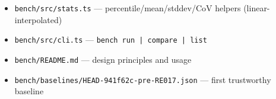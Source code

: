 \begin{itemize}
  \begin{itemize}
  \tightlist
  \item
    \texttt{c\allowbreak{}h\allowbreak{}i\allowbreak{}l\allowbreak{}d\allowbreak{}.\allowbreak{}t\allowbreak{}s} runs ONE sample of ONE scenario in a fresh V8 isolate and exits
  \item
    \texttt{r\allowbreak{}u\allowbreak{}n\allowbreak{}n\allowbreak{}e\allowbreak{}r\allowbreak{}.\allowbreak{}t\allowbreak{}s} spawns N children per scenario, aggregates stats
  \item
    \texttt{c\allowbreak{}o\allowbreak{}m\allowbreak{}p\allowbreak{}a\allowbreak{}r\allowbreak{}e\allowbreak{}.\allowbreak{}t\allowbreak{}s} diffs two report JSONs with a regression gate
  \end{itemize}
\item
  \texttt{b\allowbreak{}e\allowbreak{}n\allowbreak{}c\allowbreak{}h\allowbreak{}/\allowbreak{}s\allowbreak{}r\allowbreak{}c\allowbreak{}/\allowbreak{}s\allowbreak{}t\allowbreak{}a\allowbreak{}t\allowbreak{}s\allowbreak{}.\allowbreak{}t\allowbreak{}s} --- percentile/mean/stddev/CoV helpers (linear-interpolated)
\item
  \texttt{b\allowbreak{}e\allowbreak{}n\allowbreak{}c\allowbreak{}h\allowbreak{}/\allowbreak{}s\allowbreak{}r\allowbreak{}c\allowbreak{}/\allowbreak{}c\allowbreak{}l\allowbreak{}i\allowbreak{}.\allowbreak{}t\allowbreak{}s} --- \texttt{b\allowbreak{}e\allowbreak{}n\allowbreak{}c\allowbreak{}h\allowbreak{} \allowbreak{}r\allowbreak{}u\allowbreak{}n\allowbreak{} \allowbreak{}|\allowbreak{} \allowbreak{}c\allowbreak{}o\allowbreak{}m\allowbreak{}p\allowbreak{}a\allowbreak{}r\allowbreak{}e\allowbreak{} \allowbreak{}|\allowbreak{} \allowbreak{}l\allowbreak{}i\allowbreak{}s\allowbreak{}t}
\item
  \texttt{b\allowbreak{}e\allowbreak{}n\allowbreak{}c\allowbreak{}h\allowbreak{}/\allowbreak{}R\allowbreak{}E\allowbreak{}A\allowbreak{}D\allowbreak{}M\allowbreak{}E\allowbreak{}.\allowbreak{}m\allowbreak{}d} --- design principles and usage
\item
  \texttt{b\allowbreak{}e\allowbreak{}n\allowbreak{}c\allowbreak{}h\allowbreak{}/\allowbreak{}b\allowbreak{}a\allowbreak{}s\allowbreak{}e\allowbreak{}l\allowbreak{}i\allowbreak{}n\allowbreak{}e\allowbreak{}s\allowbreak{}/\allowbreak{}H\allowbreak{}E\allowbreak{}A\allowbreak{}D\allowbreak{}-\allowbreak{}9\allowbreak{}4\allowbreak{}1\allowbreak{}f\allowbreak{}6\allowbreak{}2\allowbreak{}c\allowbreak{}-\allowbreak{}p\allowbreak{}r\allowbreak{}e\allowbreak{}-\allowbreak{}R\allowbreak{}E\allowbreak{}0\allowbreak{}1\allowbreak{}7\allowbreak{}.\allowbreak{}j\allowbreak{}s\allowbreak{}o\allowbreak{}n} --- first trustworthy baseline
\end{itemize}

